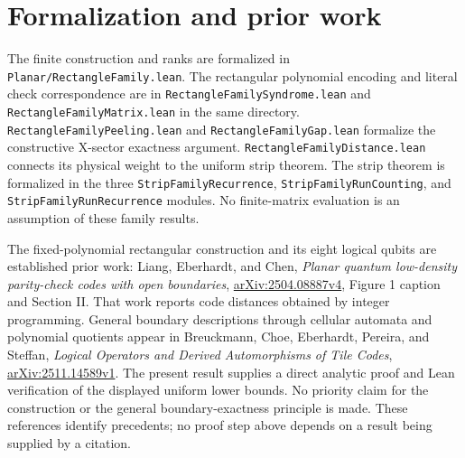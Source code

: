 \documentclass{article}
\begin{document}
\section{Formalization and prior work}\label{sec:prior-work}
\begingroup\sloppy
The finite construction and ranks are formalized in
\texttt{Planar/RectangleFamily.lean}. The rectangular polynomial encoding
and literal check correspondence are in
\texttt{RectangleFamilySyndrome.lean} and
\texttt{RectangleFamilyMatrix.lean} in the same directory.
\texttt{RectangleFamilyPeeling.lean} and
\texttt{RectangleFamilyGap.lean} formalize the constructive X-sector
exactness argument. \texttt{RectangleFamilyDistance.lean} connects its
physical weight to the uniform strip theorem.
The strip theorem is formalized in the three
\texttt{StripFamilyRecurrence}, \texttt{StripFamilyRunCounting}, and
\texttt{StripFamilyRunRecurrence} modules. No finite-matrix evaluation is
an assumption of these family results.

The fixed-polynomial rectangular construction and its eight logical qubits
are established prior work: Liang, Eberhardt, and Chen,
\emph{Planar quantum low-density parity-check codes with open boundaries},
\href{https://arxiv.org/html/2504.08887v4}{arXiv:2504.08887v4},
Figure 1 caption and Section II. That work reports code distances obtained
by integer programming. General boundary descriptions through cellular
automata and polynomial quotients appear in Breuckmann, Choe, Eberhardt,
Pereira, and Steffan,
\emph{Logical Operators and Derived Automorphisms of Tile Codes},
\href{https://arxiv.org/html/2511.14589v1}{arXiv:2511.14589v1}.
The present result supplies a direct analytic proof and Lean verification
of the displayed uniform lower bounds. No priority claim for the
construction or the general boundary-exactness principle is made.
These references identify precedents; no proof step above depends on a
result being supplied by a citation.

\endgroup
\end{document}

